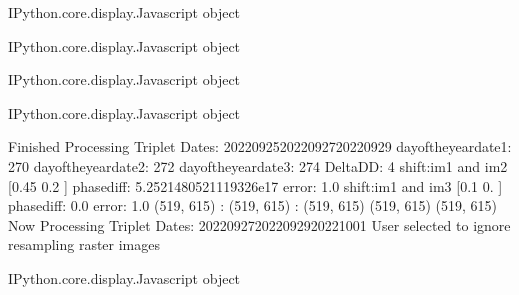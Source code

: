 \documentclass[letterpaper,10pt]{sphinxmanual}
\begin{document}
\begin{sphinxVerbatim}[commandchars=\\\{\}]
\PYGZlt{}IPython.core.display.Javascript object\PYGZgt{}
\end{sphinxVerbatim}



\begin{sphinxVerbatim}[commandchars=\\\{\}]
\PYGZlt{}IPython.core.display.Javascript object\PYGZgt{}
\end{sphinxVerbatim}



\begin{sphinxVerbatim}[commandchars=\\\{\}]
\PYGZlt{}IPython.core.display.Javascript object\PYGZgt{}
\end{sphinxVerbatim}



\begin{sphinxVerbatim}[commandchars=\\\{\}]
\PYGZlt{}IPython.core.display.Javascript object\PYGZgt{}
\end{sphinxVerbatim}



\begin{sphinxVerbatim}[commandchars=\\\{\}]
Finished Processing Triplet Dates:  20220925\PYGZhy{}20220927\PYGZhy{}20220929
day\PYGZus{}of\PYGZus{}the\PYGZus{}year\PYGZus{}date1:  270
\PYGZhy{}\PYGZhy{}\PYGZhy{}\PYGZhy{}\PYGZhy{}\PYGZhy{}\PYGZhy{}\PYGZhy{}\PYGZhy{}\PYGZhy{}\PYGZhy{}\PYGZhy{}\PYGZhy{}\PYGZhy{}\PYGZhy{}\PYGZhy{}\PYGZhy{}\PYGZhy{}\PYGZhy{}\PYGZhy{}\PYGZhy{}
day\PYGZus{}of\PYGZus{}the\PYGZus{}year\PYGZus{}date2:  272
\PYGZhy{}\PYGZhy{}\PYGZhy{}\PYGZhy{}\PYGZhy{}\PYGZhy{}\PYGZhy{}\PYGZhy{}\PYGZhy{}\PYGZhy{}\PYGZhy{}\PYGZhy{}\PYGZhy{}\PYGZhy{}\PYGZhy{}\PYGZhy{}\PYGZhy{}\PYGZhy{}\PYGZhy{}\PYGZhy{}\PYGZhy{}
day\PYGZus{}of\PYGZus{}the\PYGZus{}year\PYGZus{}date3:  274
\PYGZhy{}\PYGZhy{}\PYGZhy{}\PYGZhy{}\PYGZhy{}\PYGZhy{}\PYGZhy{}\PYGZhy{}\PYGZhy{}\PYGZhy{}\PYGZhy{}\PYGZhy{}\PYGZhy{}\PYGZhy{}\PYGZhy{}\PYGZhy{}\PYGZhy{}\PYGZhy{}\PYGZhy{}\PYGZhy{}\PYGZhy{}
Delta\PYGZus{}DD: 4
shift:im1 and im2 [\PYGZhy{}0.45 \PYGZhy{}0.2 ] phasediff: 5.2521480521119326e\PYGZhy{}17 error: 1.0
shift:im1 and im3 [0.1 0. ] phasediff: \PYGZhy{}0.0 error: 1.0
(519, 615) :  (519, 615) :  (519, 615)
(519, 615)
(519, 615)
Now Processing Triplet Dates:  20220927\PYGZhy{}20220929\PYGZhy{}20221001
 User selected to ignore resampling raster images 



\PYGZlt{}IPython.core.display.Javascript object\PYGZgt{}
\end{sphinxVerbatim}
\end{document}

